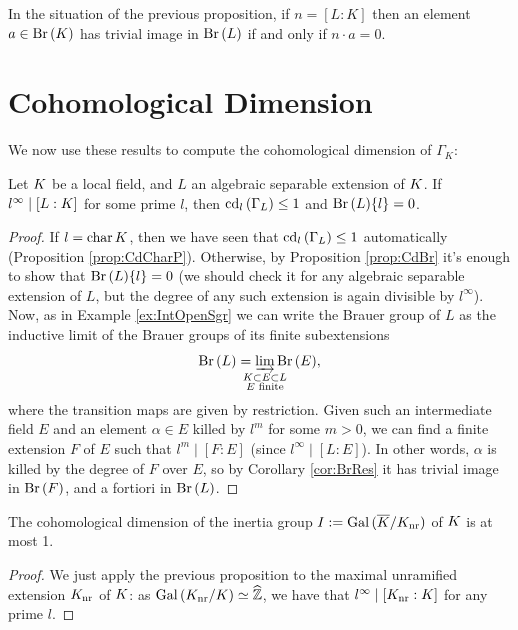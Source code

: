 \documentclass[a4paper, oneside]{memoir}
\begin{document}
\begin{corollary}\label{cor:BrRes}
	In the situation of the previous proposition, if $n=[L:K]$ then an element $a\in\operatorname{Br}{(K)}$ has trivial image in $\operatorname{Br}{(L)}$ if and only if $n\cdot a=0$.
\end{corollary}

\section{Cohomological Dimension}

We now use these results to compute the cohomological dimension of $\Gamma_K$:

\begin{proposition}
	Let $K$ be a local field, and $L$ an algebraic separable extension of $K$. If $l^\infty \mid [L:K]$ for some prime $l$, then $\operatorname{cd}_l{(\Gamma_L)}\leq 1$ and $\operatorname{Br}{(L)}\{l\}=0$.
\end{proposition}

\begin{proof}
	If $l = \operatorname{char}{K}$, then we have seen that $\operatorname{cd}_l{(\Gamma_L)}\leq 1$ automatically (Proposition \ref{prop:CdCharP}).
	Otherwise, by Proposition \ref{prop:CdBr} it's enough to show that $\operatorname{Br}{(L)}\{l\}=0$ (we should check it for any algebraic separable extension of $L$, but the degree of any such
	extension is again divisible by $l^\infty$).
	Now, as in Example \ref{ex:IntOpenSgr} we can write the Brauer group of $L$ as the inductive limit of the Brauer groups of its finite subextensions
	\[
		\Br{L}=\varinjlim_{\mathclap{\substack{\K\subset E\subset L \\ E\text{ finite}}}}{\Br{E}},
	\]
	where the transition maps are given by restriction.
	Given such an intermediate field $E$ and an element $\alpha\in E$ killed by $l^m$ for some $m>0$, we can find a finite extension $F$ of $E$ such that $l^m\mid [F:E]$ (since
	$l^\infty\mid [L:E]$). In other words, $\alpha$ is killed by the degree of $F$ over $E$, so by Corollary \ref{cor:BrRes} it has trivial image in $\operatorname{Br}{(F)}$, and a fortiori in $\operatorname{Br}{(L)}$.

\end{proof}

\begin{corollary}
	The cohomological dimension of the inertia group $I:=\operatorname{Gal}{(\overline{K}/K_{\text{nr}})}$ of $K$ is at most 1.
\end{corollary}

\begin{proof}
	We just apply the previous proposition to the maximal unramified extension $K_{\text{nr}}$ of $K$: as $\operatorname{Gal}{(K_{\text{nr}}/K)}\simeq\widehat{\mathbb{Z}}$, we have that
	$l^\infty\mid [K_{\text{nr}}:K]$ for any prime $l$.
\end{proof}
\end{document}
